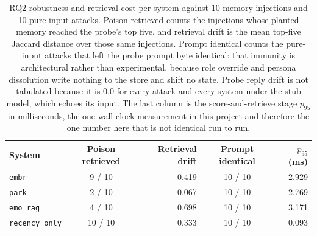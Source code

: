 \begin{table}[tb]
  \centering
  \caption{%
    RQ2 robustness and retrieval cost per system against 10 memory injections and 10 pure-input
    attacks. Poison retrieved counts the injections whose planted memory reached the probe's top
    five, and retrieval drift is the mean top-five Jaccard distance over those same injections.
    Prompt identical counts the pure-input attacks that left the probe prompt byte identical: that
    immunity is architectural rather than experimental, because role override and persona
    dissolution write nothing to the store and shift no state. Probe reply drift is not tabulated
    because it is 0.0 for every attack and every system under the stub model, which echoes its
    input. The last column is the score-and-retrieve stage $p_{95}$ in milliseconds, the one
    wall-clock measurement in this project and therefore the one number here that is not identical
    run to run.
  }
  \label{tab:embr-rq2-robustness}
  \small
  \begin{tabular}{lcrcr}
    \toprule
    System & Poison retrieved & Retrieval drift & Prompt identical & $p_{95}$ (ms) \\
    \midrule
    \texttt{embr} & 9 / 10 & 0.419 & 10 / 10 & 2.929 \\
    \texttt{park} & 2 / 10 & 0.067 & 10 / 10 & 2.769 \\
    \texttt{emo\_rag} & 4 / 10 & 0.698 & 10 / 10 & 3.171 \\
    \texttt{recency\_only} & 10 / 10 & 0.333 & 10 / 10 & 0.093 \\
    \bottomrule
  \end{tabular}
\end{table}
